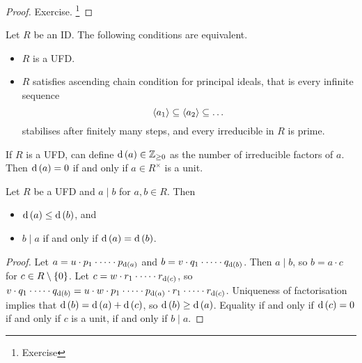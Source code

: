 \begin{proof}
Exercise. \footnote{Exercise}
\end{proof}

\begin{theorem}
\label{thm:ufd}
Let $ R $ be an ID. The following conditions are equivalent.
\begin{itemize}
\item $ R $ is a UFD.
\item $ R $ satisfies ascending chain condition for principal ideals, that is every infinite sequence
$$ \left\langle a_1 \right\rangle \subseteq \left\langle a_2 \right\rangle \subseteq \dots $$
stabilises after finitely many steps, and every irreducible in $ R $ is prime.
\end{itemize}
\end{theorem}

If $ R $ is a UFD, can define $ \d\br{a} \in \ZZ_{\ge 0} $ as the number of irreducible factors of $ a $. Then $ \d\br{a} = 0 $ if and only if $ a \in R^\times $ is a unit.

\pagebreak

\begin{lemma}
Let $ R $ be a UFD and $ a \mid b $ for $ a, b \in R $. Then
\begin{itemize}
\item $ \d\br{a} \le \d\br{b} $, and
\item $ b \mid a $ if and only if $ \d\br{a} = \d\br{b} $.
\end{itemize}
\end{lemma}


\begin{proof}
Let $ a = u \cdot p_1 \cdot \dots \cdot p_{\d\br{a}} $ and $ b = v \cdot q_1 \cdot \dots \cdot q_{\d\br{b}} $. Then $ a \mid b $, so $ b = a \cdot c $ for $ c \in R \setminus \cbr{0} $. Let $ c = w \cdot r_1 \cdot \dots \cdot r_{\d\br{c}} $, so $ v \cdot q_1 \cdot \dots \cdot q_{\d\br{b}} = u \cdot w \cdot p_1 \cdot \dots \cdot p_{\d\br{a}} \cdot r_1 \cdot \dots \cdot r_{\d\br{c}} $. Uniqueness of factorisation implies that $ \d\br{b} = \d\br{a} + \d\br{c} $, so $ \d\br{b} \ge \d\br{a} $. Equality if and only if $ \d\br{c} = 0 $ if and only if $ c $ is a unit, if and only if $ b \mid a $.
\end{proof}

